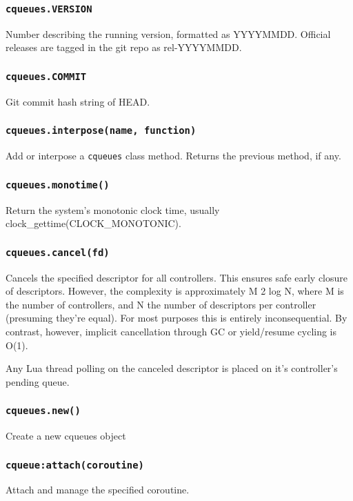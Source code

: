 \documentclass[11pt, oneside]{memoir}
\newcommand*{\cqueues}[0]{\texttt{cqueues}\xspace}
\newcommand*{\routine}[1]{\texttt{#1}\xspace}
\begin{document}
\subsubsection{\routine{cqueues.VERSION}}
Number describing the running version, formatted as YYYYMMDD. Official releases are tagged in the git repo as rel-YYYYMMDD.

\subsubsection{\routine{cqueues.COMMIT}}
Git commit hash string of HEAD.

\subsubsection[\routine{cqueues.interpose}]{\routine{cqueues.interpose(name, function)}}
Add or interpose a \cqueues class method. Returns the previous method, if any.

\subsubsection[\routine{cqueues.monotime}]{\routine{cqueues.monotime()}}
Return the system's monotonic clock time, usually clock\_gettime(CLOCK\_MONOTONIC).

\subsubsection[\routine{cqueues.cancel}]{\routine{cqueues.cancel(fd)}}
Cancels the specified descriptor for all controllers. This ensures safe early closure of descriptors. However, the complexity is approximately M 2 log N, where M is the number of controllers, and N the number of descriptors per controller (presuming they're equal). For most purposes this is entirely inconsequential. By contrast, however, implicit cancellation through GC or yield/resume cycling is O(1).

Any Lua thread polling on the canceled descriptor is placed on it's controller's pending queue.

\subsubsection[\routine{cqueues.new}]{\routine{cqueues.new()}}
Create a new cqueues object

\subsubsection[\routine{cqueues:attach}]{\routine{cqueue:attach(coroutine)}}
Attach and manage the specified coroutine.
\end{document}
